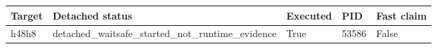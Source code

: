 {\small
\begin{tabular}{lllll}
\hline
Target & Detached status & Executed & PID & Fast claim \\
\hline
h48h8 & detached\_waitsafe\_started\_not\_runtime\_evidence & True & 53586 & False \\
\hline
\end{tabular}
}
